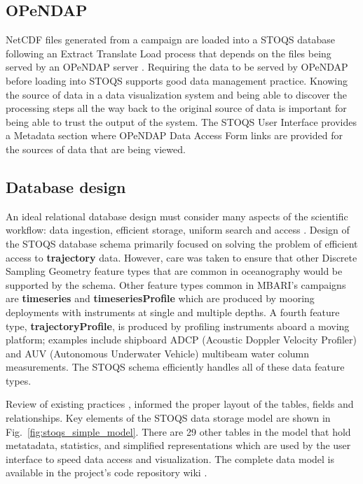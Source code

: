 \documentclass[conference]{IEEEtran}
\begin{document}
\subsection{OPeNDAP}

NetCDF files generated from a campaign are loaded into a STOQS database following an Extract Translate
Load process that depends on the files being served by an OPeNDAP server \cite{Cornillon03opendap:accessing}.
Requiring the data to be served by OPeNDAP before loading into STOQS
supports good data management practice. Knowing the source of data in a data visualization 
system and being able to discover the processing steps all the way back to the original source
of data is important for being able to trust the output of the system. The STOQS User Interface
provides a Metadata section where OPeNDAP Data Access Form links are provided for the sources 
of data that are being viewed.

\subsection{Database design}
An ideal relational database design must consider many aspects of the scientific 
workflow: data ingestion, efficient storage, uniform search and access 
\cite{Bechini:2013:MSS:2425433.2425647}. Design of the STOQS database schema primarily 
focused on solving the problem of efficient access to \textbf{trajectory} data. 
However, care was taken to ensure that other Discrete Sampling Geometry feature types 
\cite{DSG} that are common in oceanography would be supported by the schema.  Other 
feature types common in MBARI's campaigns are \textbf{timeseries} and \textbf{timeseriesProfile} 
which are produced by mooring deployments with instruments at single and multiple depths. 
A fourth feature type, \textbf{trajectoryProfile}, is produced by profiling instruments 
aboard a moving platform; examples include shipboard ADCP (Acoustic Doppler Velocity Profiler)
and AUV (Autonomous Underwater Vehicle) multibeam water column 
measurements. The STOQS schema efficiently handles all of these data feature types.

Review of existing practices \cite{Wright}, \cite{MODB} informed the proper layout 
of the tables, fields and relationships.  Key elements of the STOQS data storage model 
are shown in Fig.~\ref{fig:stoqs_simple_model}. There are 29 other tables in the model 
that hold metatadata, statistics, and simplified representations which are used by 
the user interface to speed data access and visualization. The complete data model 
is available in the project's code repository wiki \cite{stoqs_github}. 
\end{document}
